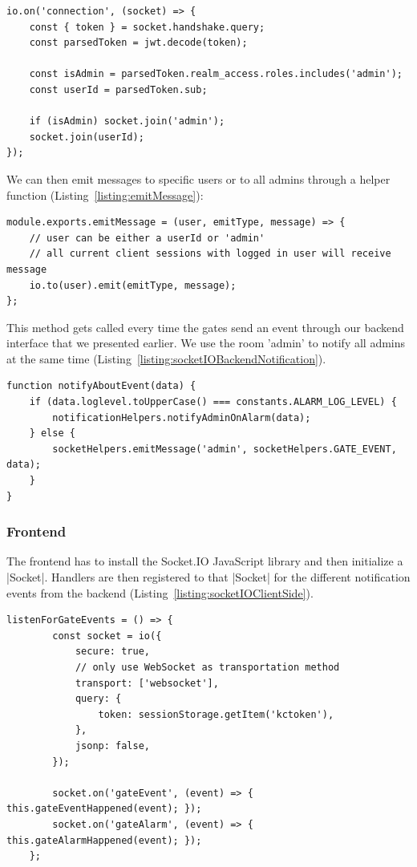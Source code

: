 \begin{lstlisting}[label={listing:onConnection},caption={Handling client connections to Socket.IO server}]
io.on('connection', (socket) => {
    const { token } = socket.handshake.query;
    const parsedToken = jwt.decode(token);

    const isAdmin = parsedToken.realm_access.roles.includes('admin');
    const userId = parsedToken.sub;

    if (isAdmin) socket.join('admin');
    socket.join(userId);
});
\end{lstlisting}

We can then emit messages to specific users or to all admins through a helper function (Listing~\ref{listing:emitMessage}):
\begin{lstlisting}[label={listing:emitMessage},caption={Helper function for emitting notifications}]
module.exports.emitMessage = (user, emitType, message) => {
    // user can be either a userId or 'admin'
    // all current client sessions with logged in user will receive message
    io.to(user).emit(emitType, message);
};
\end{lstlisting}

This method gets called every time the gates send an event through our backend interface that we presented earlier. We use the room 'admin' to notify all admins at the same time (Listing~\ref{listing:socketIOBackendNotification}).

\begin{lstlisting}[label={listing:socketIOBackendNotification},caption={Emission of notification to all admins}]
function notifyAboutEvent(data) {
    if (data.loglevel.toUpperCase() === constants.ALARM_LOG_LEVEL) {
        notificationHelpers.notifyAdminOnAlarm(data);
    } else {
        socketHelpers.emitMessage('admin', socketHelpers.GATE_EVENT, data);
    }
}
\end{lstlisting}

\subsubsection{Frontend}
\label{Frontend}

The frontend has to install the Socket.IO JavaScript library and then initialize a |Socket|\cite{socketio:socket}. Handlers are then registered to that |Socket| for the different notification events from the backend (Listing~\ref{listing:socketIOClientSide}).

\begin{lstlisting}[label={listing:socketIOClientSide},caption={Setup of Socket.IO socket}]
listenForGateEvents = () => {
        const socket = io({
            secure: true,
            // only use WebSocket as transportation method
            transport: ['websocket'],
            query: {
                token: sessionStorage.getItem('kctoken'),
            },
            jsonp: false,
        });

        socket.on('gateEvent', (event) => { this.gateEventHappened(event); });
        socket.on('gateAlarm', (event) => { this.gateAlarmHappened(event); });
    };
\end{lstlisting}


